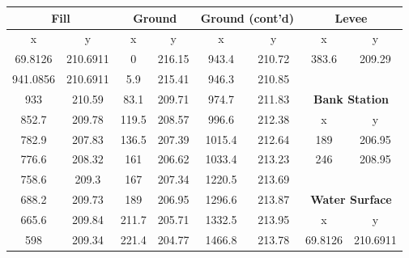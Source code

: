 \begin{center}

\begin{tabular}{|cccc||cc||cc|} 
    \hline
    \multicolumn{2}{|c}{\textbf{Fill}} & \multicolumn{2}{c||}{\textbf{Ground}} & \multicolumn{2}{c||}{\textbf{Ground (cont'd)}} & \multicolumn{2}{c|}{\textbf{Levee}}           \\ 
    \hline
    x        & y                       & x     & y                            & x      & y                           & x        & y                                  \\
    69.8126  & 210.6911                & 0     & 216.15                       & 943.4  & 210.72                      & 383.6    & 209.29                             \\
    941.0856 & 210.6911                & 5.9   & 215.41                       & 946.3  & 210.85                      &          &                                    \\
    933      & 210.59                  & 83.1  & 209.71                       & 974.7  & 211.83                      & \multicolumn{2}{c|}{\textbf{Bank Station}}    \\ 
    \cline{7-8}
    852.7    & 209.78                  & 119.5 & 208.57                       & 996.6  & 212.38                      & x        & y                                  \\
    782.9    & 207.83                  & 136.5 & 207.39                       & 1015.4 & 212.64                      & 189      & 206.95                             \\
    776.6    & 208.32                  & 161   & 206.62                       & 1033.4 & 213.23                      & 246      & 208.95                             \\
    758.6    & 209.3                   & 167   & 207.34                       & 1220.5 & 213.69                      &          &                                    \\
    688.2    & 209.73                  & 189   & 206.95                       & 1296.6 & 213.87                      & \multicolumn{2}{c|}{\textbf{Water Surface}}   \\ 
    \cline{7-8}
    665.6    & 209.84                  & 211.7 & 205.71                       & 1332.5 & 213.95                      & x        & y                                  \\
    598      & 209.34                  & 221.4 & 204.77                       & 1466.8 & 213.78                      & 69.8126  & 210.6911                           \\

\end{tabular}
\end{center}
